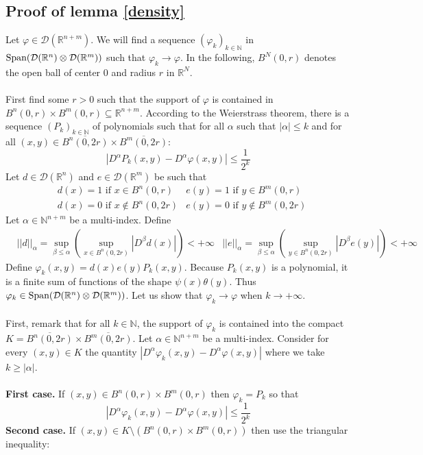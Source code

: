 \documentclass[11pt,a4paper]{article}
\newcommand{\ph}{\varphi}
\newcommand{\gr}{\textbf}
\newcommand{\N}{\mathbb{N}}
\newcommand{\R}{\mathbb{R}}
\newcommand{\1}{\mathbbm{1}}
\newcommand{\D}{\mathcal{D}}
\begin{document}
\subsection*{Proof of lemma \ref{density}}
Let $\ph \in \D(\R^{n+m})$. We will find a sequence $(\ph_k)_{k\in\N}$ in $\textnormal{Span}(\D(\R^n)\otimes\D(\R^m))$ such that $\ph_k \to \ph$. In the following, $B^N(0,r)$ denotes the open ball of center $0$ and radius $r$ in $\R^N$.\\\\ First find some $r > 0$ such that the support of $\ph$ is contained in $B^n(0,r) \times B^m(0,r) \subseteq \R^{n+m}$. According to the Weierstrass theorem, there is a sequence $(P_k)_{k\in\N}$ of polynomials such that for all $\alpha$ such that $|\alpha|\leq k$ and for all $(x,y) \in \overline{B^n(0,2r)}\times \overline{B^m(0,2r)}$:
\[ |D^\alpha P_k(x,y) - D^\alpha \ph(x,y) | \leq \frac{1}{2^k}\]
Let $d \in \D(\R^n)$ and $e \in \D(\R^m)$ be such that
\begin{align*}
& d(x) = 1 \text{ if } x \in B^n(0,r) & e(y) = 1 \text{ if } y \in B^m(0,r) \\
& d(x) = 0 \text{ if } x \not\in B^n(0,2r) & e(y) = 0 \text{ if } y \not\in B^m(0,2r)
\end{align*}
Let $\alpha \in \N^{n+m}$ be a multi-index. Define
\begin{align*} & ||d||_\alpha = \sup_{\beta \leq \alpha} \left(\sup_{x \in B^n(0,2r)} |D^\beta d (x)|\right) < +\infty 
& ||e||_\alpha = \sup_{\beta \leq \alpha} \left(\sup_{y \in B^n(0,2r)} |D^\beta e(y) | \right) < +\infty \end{align*}
Define $\ph_k(x,y) = d(x)e(y)P_k(x,y)$. Because $P_k(x,y)$ is a polynomial, it is a finite sum of functions of the shape $\psi(x)\theta(y)$. Thus $\ph_k \in \textnormal{Span}(\D(\R^n) \otimes \D(\R^m))$. Let us show that $\ph_k \to \ph$ when $k \to +\infty$.\\\\
First, remark that for all $k \in \N$, the support of $\ph_k$ is contained into the compact $K = \overline{B^n(0,2r)} \times \overline{B^m(0,2r)}$. Let $\alpha \in \N^{n+m}$ be a multi-index. Consider for every $(x,y) \in K$ the quantity $|D^\alpha \ph_k(x,y) - D^\alpha \ph(x,y) |$ where we take $k \geq |\alpha|$.\\\\
\gr{First case.} If $(x,y) \in B^n(0,r) \times B^m(0,r)$ then $\ph_k = P_k$ so that
\[ |D^\alpha \ph_k(x,y) - D^\alpha \ph(x,y) | \leq \frac{1}{2^k} \]
\gr{Second case.} If $(x,y) \in K \setminus \left( B^n(0,r) \times B^m(0,r) \right)$ then use the triangular inequality:
\end{document}

